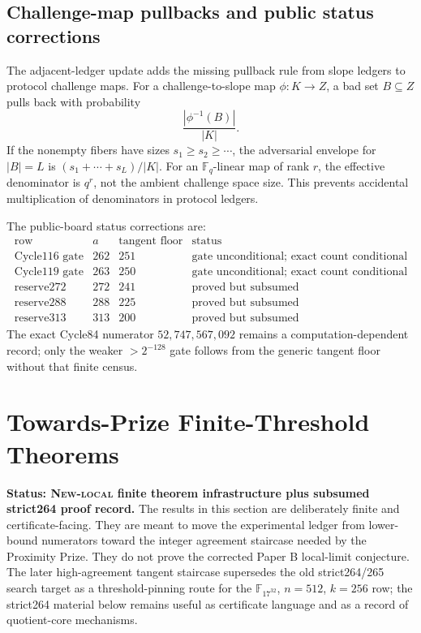 \documentclass[11pt]{article}
\newcommand{\F}{\mathbb F}
\begin{document}
\subsection{Challenge-map pullbacks and public status corrections}

The adjacent-ledger update adds the missing pullback rule from slope ledgers to
protocol challenge maps.  For a challenge-to-slope map \(\phi:K\to Z\), a bad
set \(B\subseteq Z\) pulls back with probability
\[
  \frac{|\phi^{-1}(B)|}{|K|}.
\]
If the nonempty fibers have sizes \(s_1\ge s_2\ge\cdots\), the adversarial
envelope for \(|B|=L\) is \((s_1+\cdots+s_L)/|K|\).  For an \(\F_q\)-linear map
of rank \(r\), the effective denominator is \(q^r\), not the ambient challenge
space size.  This prevents accidental multiplication of denominators in protocol
ledgers.

The public-board status corrections are:
\[
\begin{array}{c|c|c|c}
\text{row} & a & \text{tangent floor} & \text{status}\\
\hline
\text{Cycle116 gate} & 262 & 251 & \text{gate unconditional; exact count conditional}\\
\text{Cycle119 gate} & 263 & 250 & \text{gate unconditional; exact count conditional}\\
\text{reserve272} & 272 & 241 & \text{proved but subsumed}\\
\text{reserve288} & 288 & 225 & \text{proved but subsumed}\\
\text{reserve313} & 313 & 200 & \text{proved but subsumed}
\end{array}
\]
The exact Cycle84 numerator \(52{,}747{,}567{,}092\) remains a
computation-dependent record; only the weaker \(>2^{-128}\) gate follows from
the generic tangent floor without that finite census.







\section{Towards-Prize Finite-Threshold Theorems}
\label{sec:towards-prize-thresholds}

\textbf{Status: \textsc{New-local} finite theorem infrastructure plus
subsumed strict264 proof record.}
The results in this section are deliberately finite and certificate-facing.  They
are meant to move the experimental ledger from lower-bound numerators toward the
integer agreement staircase needed by the Proximity Prize.  They do not prove the
corrected Paper B local-limit conjecture.  The later
high-agreement tangent staircase supersedes the old strict264/265 search target
as a threshold-pinning route for the \(\F_{17^{32}}\), \(n=512\), \(k=256\)
row; the strict264 material below remains useful as certificate language and
as a record of quotient-core mechanisms.
\end{document}
